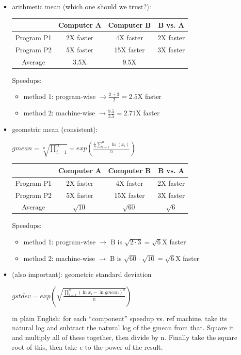 \documentclass[12pt]{extarticle}
\begin{document}
	\begin{itemize}
		\item arithmetic mean (which one should we trust?):
		
		\begin{tabular}[h!]{|c|c|c|c|} \hline
					   & Computer A & Computer B & B vs. A   \\ \hline
			Program P1 & 2X faster  & 4X faster  & 2X faster \\ \hline
			Program P2 & 5X faster  & 15X faster & 3X faster \\ \hline
			Average	   & 3.5X		& 9.5X		 &			 \\ \hline
		\end{tabular}

		Speedups:

		\begin{itemize}
			\item method 1: program-wise $\longrightarrow \frac{2 + 3}{2} = 2.5$X faster
			\item method 2: machine-wise $\longrightarrow \frac{9.5}{3.5} = 2.71$X faster
		\end{itemize}

		\item geometric mean (consistent):
		
		$\displaystyle gmean = \sqrt[n]{\prod_{i = 1}^n} = exp(\frac{\frac{1}{n} \sum_{i=1}^n \ln (x_i)}{n})$

		\begin{tabular}[h!]{|c|c|c|c|} \hline
					   & Computer A 	& Computer B 	& B vs. A   	\\ \hline
			Program P1 & 2X faster  	& 4X faster  	& 2X faster 	\\ \hline
			Program P2 & 5X faster  	& 15X faster 	& 3X faster 	\\ \hline
			Average	   & $\sqrt{10}$	& $\sqrt{60}$	& $\sqrt{6}$	\\ \hline
		\end{tabular}

		Speedups:

		\begin{itemize}
			\item method 1: program-wise $\longrightarrow$ B is $\sqrt{2 \cdot 3} = \sqrt{6}$X faster
			\item method 2: machine-wise $\longrightarrow$ B is $\sqrt{60} \cdot \sqrt{10} = \sqrt{6}$X faster
		\end{itemize}

		\item (also important): geometric standard deviation
		
		$\displaystyle gstdev = exp(\sqrt{\frac{\prod_{i=1}^n (\ln x_i - \ln gmean)^2}{n}})$

		in plain English: for each ``component'' speedup vs. ref machine, take its natural log and subtract the natural 
		log of the gmean from that. Square it and multiply all of these together, then divide by n. Finally take the 
		square root of this, then take $e$ to the power of the result.
	\end{itemize}
\end{document}
